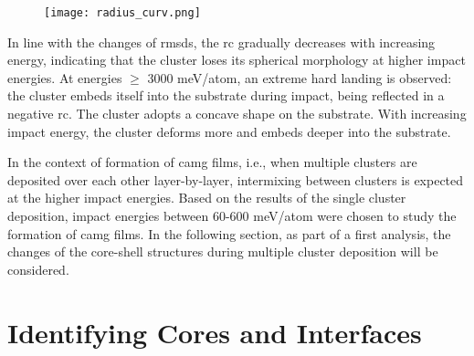 \begin{changebar}
\begin{figure}[!h]\centering
	\texttt{[image: radius\_curv.png]}
	\label{f:rccalc}
\end{figure}%

In line with the changes of \gls{rmsds}, the \gls{rc} gradually decreases with increasing energy, indicating that the cluster loses its spherical morphology at higher impact energies. At energies $\geq$ 3000 meV/atom, an extreme hard landing is observed: the cluster embeds itself into the substrate during impact, being reflected in a negative \gls{rc}. The cluster adopts a concave
shape on the substrate. With increasing impact energy, the cluster deforms more and embeds deeper into the substrate. \par In the context of formation of \gls{camg} films, i.e., when multiple clusters are deposited over each other layer-by-layer, intermixing between clusters is expected at the higher impact energies. Based on the results of the single cluster deposition, impact energies between 60-600 meV/atom were chosen to study the formation of \gls{camg} films. In the following section, as part of a first analysis, the changes of the core-shell structures during multiple cluster deposition will be considered.
\end{changebar}
%
%
\section{Identifying Cores and Interfaces} \label{s:corint}

